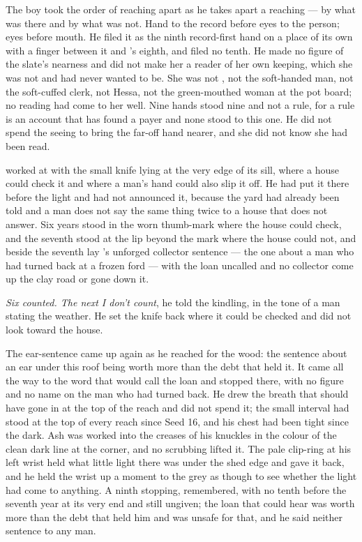 The boy took the order of reaching apart as he takes apart a reaching --- by what was there and by what was not. Hand to the record before eyes to the person; eyes before mouth. He filed it as the ninth record-first hand on a place of its own with a finger between it and 's eighth, and filed no tenth. He made no figure of the slate's nearness and did not make her a reader of her own keeping, which she was not and had never wanted to be. She was not , not the soft-handed man, not the soft-cuffed clerk, not Hessa, not the green-mouthed woman at the pot board; no reading had come to her well. Nine hands stood nine and not a rule, for a rule is an account that has found a payer and none stood to this one. He did not spend the seeing to bring the far-off hand nearer, and she did not know she had been read.

\scenebreak

 worked at  with the small knife lying at the very edge of its sill, where a house could check it and where a man's hand could also slip it off. He had put it there before the light and had not announced it, because the yard had already been told and a man does not say the same thing twice to a house that does not answer. Six years stood in the worn thumb-mark where the house could check, and the seventh stood at the lip beyond the mark where the house could not, and beside the seventh lay 's unforged collector sentence --- the one about a man who had turned back at a frozen ford --- with the loan uncalled and no collector come up the clay road or gone down it.

\emph{Six counted. The next I don't count}, he told the kindling, in the tone of a man stating the weather. He set the knife back where it could be checked and did not look toward the house.

The ear-sentence came up again as he reached for the wood: the sentence about an ear under this roof being worth more than the debt that held it. It came all the way to the word that would call the loan and stopped there, with no figure and no name on the man who had turned back. He drew the breath that should have gone in at the top of the reach and did not spend it; the small interval had stood at the top of every reach since Seed 16, and his chest had been tight since the dark. Ash was worked into the creases of his knuckles in the colour of the clean dark line at the corner, and no scrubbing lifted it. The pale clip-ring at his left wrist held what little light there was under the shed edge and gave it back, and he held the wrist up a moment to the grey as though to see whether the light had come to anything. A ninth stopping, remembered, with no tenth before the seventh year at its very end and still ungiven; the loan that could hear was worth more than the debt that held him and was unsafe for that, and he said neither sentence to any man.

